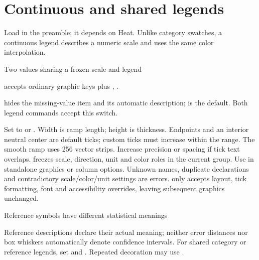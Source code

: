 \section{Continuous and shared legends}
Load  in the preamble; it depends on Heat. Unlike category swatches,
a continuous legend describes a numeric scale and uses the same color interpolation.
\begin{demo}{Two values sharing a frozen scale and legend}
\begingroup
{}
\par\medskip
{}
\endgroup
\end{demo}
\key{\gradheatlegend} accepts ordinary graphic keys plus ,
.\par
{} hides the missing-value item and its automatic description;
 is the default. Both legend commands accept this switch.\par
Set  to  or .
Width is ramp length; height is thickness. Endpoints and an interior neutral
center are default ticks; custom ticks must increase within the range. The smooth
ramp uses 256 vector strips. Increase precision or spacing if tick text overlaps.
\key{\gradlegenddefine} freezes scale, direction, unit and color roles in the
current group. Use  in standalone graphics or column
options. Unknown names, duplicate declarations and contradictory scale/color/unit
settings are errors. \key{\gradlegenduse} only accepts layout, tick formatting,
font and accessibility overrides, leaving subsequent graphics unchanged.
\begin{demo}{Reference symbols have different statistical meanings}
\end{demo}
Reference descriptions declare their actual meaning; neither error distances
nor box whiskers automatically denote confidence intervals.
For shared category or reference legends, set 
and . Repeated decoration may use .


